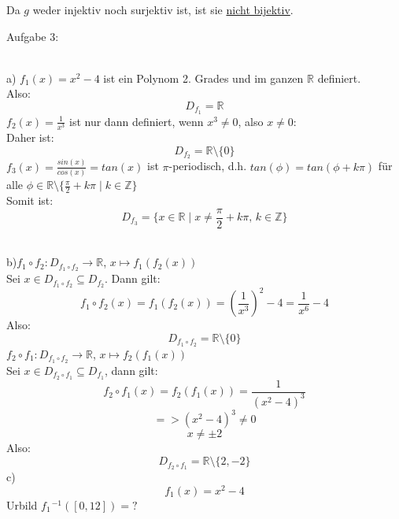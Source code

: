 \documentclass[11pt]{article}
\begin{document}
				Da $g$ weder injektiv noch surjektiv ist, ist sie \underline{nicht bijektiv}.\\
		\noindent \begin{Large}Aufgabe 3:\end{Large}\\[2pt]
			\indent a) 
				$f_1(x)=x^2-4$ ist ein Polynom 2. Grades und im ganzen $\mathbb{R}$ definiert.\\ Also:
				$$D_{f_1} = \mathbb{R}$$
				$f_2(x)=\frac{1}{x^3}$ ist nur dann definiert, wenn $x^3 \neq 0$, also $x \neq 0$:\\Daher ist:
				$$D_{f_2} = \mathbb{R}\setminus \{0\}$$
				$f_3(x) = \frac{sin(x)}{cos(x)} = tan(x)$ ist $\pi$-periodisch, d.h. $tan(\phi)=tan(\phi + k\pi)$ für alle $\phi \in \mathbb{R} \setminus \{\frac{\pi}{2}+k\pi \mid k \in \mathbb{Z}\}$\\
				Somit ist:
				$$D_{f_3} = \{x \in \mathbb{R} \mid x \neq \frac{\pi}{2}+k \pi \mbox{, } k \in \mathbb{Z}\}$$
				\\
			\indent b)$f_1 \circ f_2 : D_{f_1 \circ f_2} \rightarrow \mathbb{R}$, $x \mapsto f_1(f_2(x))$\\
				Sei $x \in D_{f_1 \circ f_2} \subseteq D_{f_2}$. Dann gilt:
				$$f_1 \circ f_2(x) = f_1(f_2(x)) = \left(\frac{1}{x^3}\right)^2-4=\frac{1}{x^6}-4$$
				Also:
				$$D_{f_1\circ f_2} = \mathbb{R}\setminus \{0\}$$
				$f_2 \circ f_1: D_{f_1 \circ f_2} \rightarrow \mathbb{R}$, $x \mapsto f_2(f_1(x))$\\
				Sei $x \in D_{f_2 \circ f_1} \subseteq D_{f_1}$, dann gilt:
				$$f_2 \circ f_1(x) = f_2(f_1(x)) = \frac{1}{(x^2-4)^3}$$
				$$=> (x^2-4)^3 \neq 0$$
				$$x \neq \pm 2$$
				Also:
				$$D_{f_2 \circ f_1} = \mathbb{R}\setminus \{2,-2\}$$
			\indent c)
				$$f_1(x)=x^2-4$$
				Urbild $f_1\hspace{1pt}^{-1}([0,12])=?$\\
\end{document}

